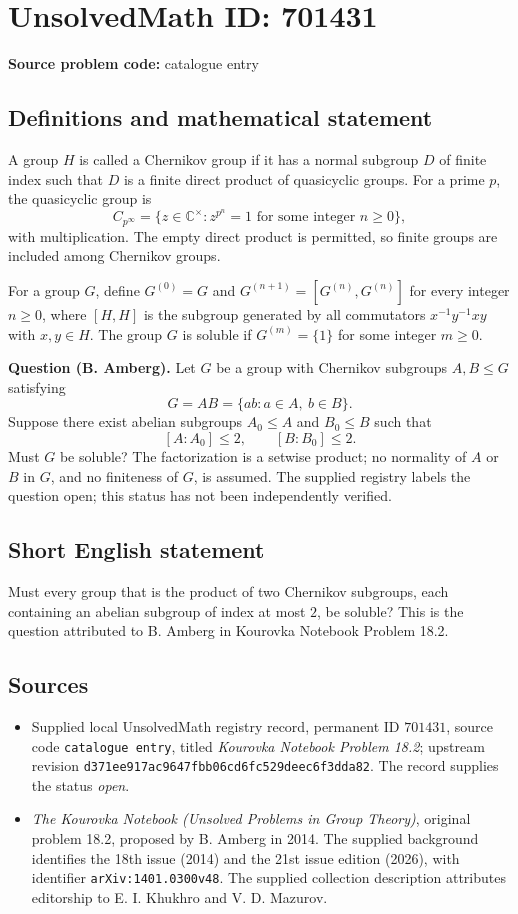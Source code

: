 \documentclass[11pt]{article}
\newcommand{\C}{\mathbb{C}}
\begin{document}
\section*{UnsolvedMath ID: 701431}
\textbf{Source problem code:} catalogue entry
\subsection{Definitions and mathematical statement}
A group \(H\) is called a Chernikov group if it has a normal subgroup \(D\) of finite index such that \(D\) is a finite direct product of quasicyclic groups. For a prime \(p\), the quasicyclic group is
\[
C_{p^\infty}=\{z\in\C^\times : z^{p^n}=1\text{ for some integer }n\geq 0\},
\]
with multiplication. The empty direct product is permitted, so finite groups are included among Chernikov groups.

For a group \(G\), define \(G^{(0)}=G\) and \(G^{(n+1)}=[G^{(n)},G^{(n)}]\) for every integer \(n\geq 0\), where \([H,H]\) is the subgroup generated by all commutators \(x^{-1}y^{-1}xy\) with \(x,y\in H\). The group \(G\) is soluble if \(G^{(m)}=\{1\}\) for some integer \(m\geq 0\).

\textbf{Question (B. Amberg).} Let \(G\) be a group with Chernikov subgroups \(A,B\leq G\) satisfying
\[
G=AB=\{ab:a\in A,\ b\in B\}.
\]
Suppose there exist abelian subgroups \(A_0\leq A\) and \(B_0\leq B\) such that
\[
[A:A_0]\leq 2,\qquad [B:B_0]\leq 2.
\]
Must \(G\) be soluble? The factorization is a setwise product; no normality of \(A\) or \(B\) in \(G\), and no finiteness of \(G\), is assumed. The supplied registry labels the question open; this status has not been independently verified.
\subsection{Short English statement}
Must every group that is the product of two Chernikov subgroups, each containing an abelian subgroup of index at most \(2\), be soluble? This is the question attributed to B. Amberg in Kourovka Notebook Problem 18.2.
\subsection{Sources}
\begin{itemize}
\item Supplied local UnsolvedMath registry record, permanent ID \(701431\), source code \texttt{catalogue entry}, titled \emph{Kourovka Notebook Problem 18.2}; upstream revision \texttt{d371ee917ac9647fbb06cd6fc529deec6f3dda82}. The record supplies the status \emph{open}.
\item \emph{The Kourovka Notebook (Unsolved Problems in Group Theory)}, original problem 18.2, proposed by B. Amberg in 2014. The supplied background identifies the 18th issue (2014) and the 21st issue edition (2026), with identifier \texttt{arXiv:1401.0300v48}. The supplied collection description attributes editorship to E. I. Khukhro and V. D. Mazurov.
\end{itemize}
\end{document}
